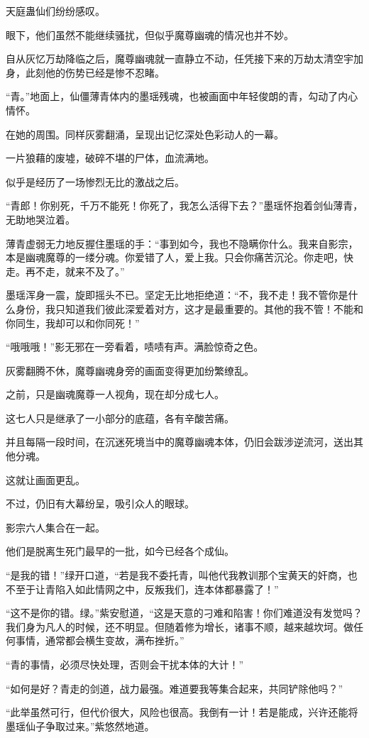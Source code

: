 \begin{this_body}
天庭蛊仙们纷纷感叹。

眼下，他们虽然不能继续骚扰，但似乎魔尊幽魂的情况也并不妙。

自从灰忆万劫降临之后，魔尊幽魂就一直静立不动，任凭接下来的万劫太清空宇加身，此刻他的伤势已经是惨不忍睹。

“青。”地面上，仙僵薄青体内的墨瑶残魂，也被画面中年轻俊朗的青，勾动了内心情怀。

在她的周围。同样灰雾翻涌，呈现出记忆深处色彩动人的一幕。

一片狼藉的废墟，破碎不堪的尸体，血流满地。

似乎是经历了一场惨烈无比的激战之后。

“青郎！你别死，千万不能死！你死了，我怎么活得下去？”墨瑶怀抱着剑仙薄青，无助地哭泣着。

薄青虚弱无力地反握住墨瑶的手：“事到如今，我也不隐瞒你什么。我来自影宗，本是幽魂魔尊的一缕分魂。你爱错了人，爱上我。只会你痛苦沉沦。你走吧，快走。再不走，就来不及了。”

墨瑶浑身一震，旋即摇头不已。坚定无比地拒绝道：“不，我不走！我不管你是什么身份，我只知道我们彼此深爱着对方，这才是最重要的。其他的我不管！不能和你同生，我却可以和你同死！”

“哦哦哦！”影无邪在一旁看着，啧啧有声。满脸惊奇之色。

灰雾翻腾不休，魔尊幽魂身旁的画面变得更加纷繁缭乱。

之前，只是幽魂魔尊一人视角，现在却分成七人。

这七人只是继承了一小部分的底蕴，各有辛酸苦痛。

并且每隔一段时间，在沉迷死境当中的魔尊幽魂本体，仍旧会跋涉逆流河，送出其他分魂。

这就让画面更乱。

不过，仍旧有大幕纷呈，吸引众人的眼球。

影宗六人集合在一起。

他们是脱离生死门最早的一批，如今已经各个成仙。

“是我的错！”绿开口道，“若是我不委托青，叫他代我教训那个宝黄天的奸商，也不至于让青陷入如此情网之中，反叛我们，连本体都暴露了！”

“这不是你的错。绿。”紫安慰道，“这是天意的刁难和陷害！你们难道没有发觉吗？我们身为凡人的时候，还不明显。但随着修为增长，诸事不顺，越来越坎坷。做任何事情，通常都会横生变故，满布挫折。”

“青的事情，必须尽快处理，否则会干扰本体的大计！”

“如何是好？青走的剑道，战力最强。难道要我等集合起来，共同铲除他吗？”

“此举虽然可行，但代价很大，风险也很高。我倒有一计！若是能成，兴许还能将墨瑶仙子争取过来。”紫悠然地道。


\end{this_body}
